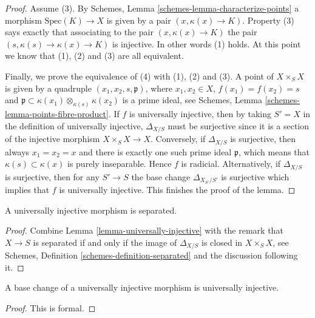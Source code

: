 \begin{proof}
\medskip\noindent
Assume (3). By
Schemes, Lemma \ref{schemes-lemma-characterize-points}
a morphism $\text{Spec}(K) \to X$ is given by a pair $(x, \kappa(x) \to K)$.
Property (3) says exactly that associating to the pair
$(x, \kappa(x) \to K)$ the pair $(s, \kappa(s) \to \kappa(x) \to K)$
is injective. In other words (1) holds. At this point we know that
(1), (2) and (3) are all equivalent.

\medskip\noindent
Finally, we prove the equivalence of (4) with (1), (2) and (3).
A point of $X \times_S X$ is given by a quadruple
$(x_1, x_2, s, \mathfrak p)$, where $x_1, x_2 \in X$,
$f(x_1) = f(x_2) = s$ and
$\mathfrak p \subset \kappa(x_1) \otimes_{\kappa(s)} \kappa(x_2)$
is a prime ideal, see
Schemes, Lemma \ref{schemes-lemma-points-fibre-product}.
If $f$ is universally injective, then 
by taking $S'=X$ in the definition of universally injective,
$\Delta_{X/S}$ must be surjective since it is a section of
the injective morphism
$X \times_S X  \longrightarrow X$.
Conversely, if
$\Delta_{X/S}$ is surjective, then always $x_1 = x_2 = x$ and there
is exactly one such prime ideal $\mathfrak p$, which means that
$\kappa(s) \subset \kappa(x)$ is purely inseparable.
Hence $f$ is radicial.
Alternatively, if $\Delta_{X/S}$ is surjective,
then for any $S' \to S$ the base
change $\Delta_{X_{S'}/S'}$ is surjective which implies that $f$
is universally injective. This finishes the proof of the lemma.
\end{proof}

\begin{lemma}
\label{lemma-universally-injective-separated}
A universally injective morphism is separated.
\end{lemma}

\begin{proof}
Combine
Lemma \ref{lemma-universally-injective}
with the remark that $X \to S$ is separated if and only if the image
of $\Delta_{X/S}$ is closed in $X \times_S X$, see
Schemes, Definition \ref{schemes-definition-separated}
and the discussion following it.
\end{proof}

\begin{lemma}
\label{lemma-base-change-universally-injective}
A base change of a universally injective morphism is universally injective.
\end{lemma}

\begin{proof}
This is formal.
\end{proof}

